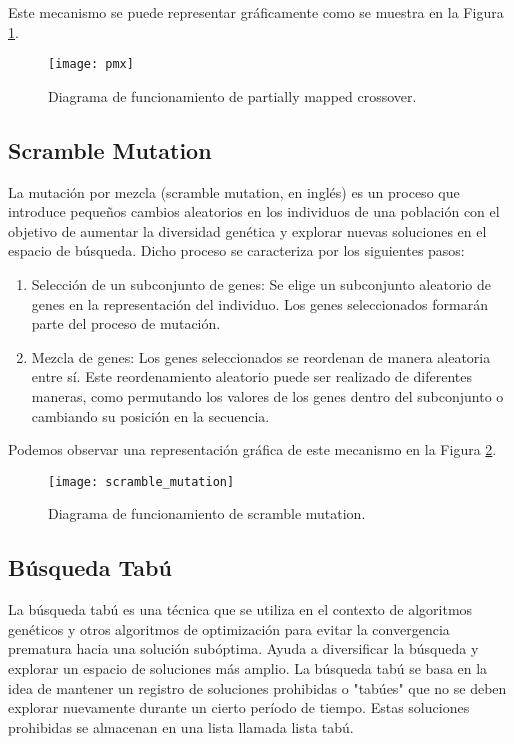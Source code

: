 Este mecanismo se puede representar gráficamente como se muestra en la Figura \ref{fig:PMx}.

\begin{figure}[htbp]
	\centering
	\texttt{[image: pmx]}
	\caption{Diagrama de funcionamiento de partially mapped crossover.}
	\label{fig:PMx}
\end{figure}


\subsection{Scramble Mutation}
La mutación por mezcla (scramble mutation, en inglés) es un proceso que introduce pequeños cambios aleatorios en los individuos de una población con el objetivo de aumentar la diversidad genética y explorar nuevas soluciones en el espacio de búsqueda. Dicho proceso se caracteriza por los siguientes pasos:

\begin{enumerate}
	\item Selección de un subconjunto de genes: Se elige un subconjunto aleatorio de genes en la representación del individuo. Los genes seleccionados formarán parte del proceso de mutación.
	\item Mezcla de genes: Los genes seleccionados se reordenan de manera aleatoria entre sí. Este reordenamiento aleatorio puede ser realizado de diferentes maneras, como permutando los valores de los genes dentro del subconjunto o cambiando su posición en la secuencia.
\end{enumerate}

Podemos observar una representación gráfica de este mecanismo en la Figura \ref{fig:scrM}.

\begin{figure}[htbp]
	\centering
	\texttt{[image: scramble\_mutation]}
	\caption{Diagrama de funcionamiento de scramble mutation.}
	\label{fig:scrM}
\end{figure}

\subsection{Búsqueda Tabú}
La búsqueda tabú es una técnica que se utiliza en el contexto de algoritmos genéticos y otros algoritmos de optimización para evitar la convergencia prematura hacia una solución subóptima. Ayuda a diversificar la búsqueda y explorar un espacio de soluciones más amplio. La búsqueda tabú se basa en la idea de mantener un registro de soluciones prohibidas o "tabúes" que no se deben explorar nuevamente durante un cierto período de tiempo. Estas soluciones prohibidas se almacenan en una lista llamada lista tabú.
